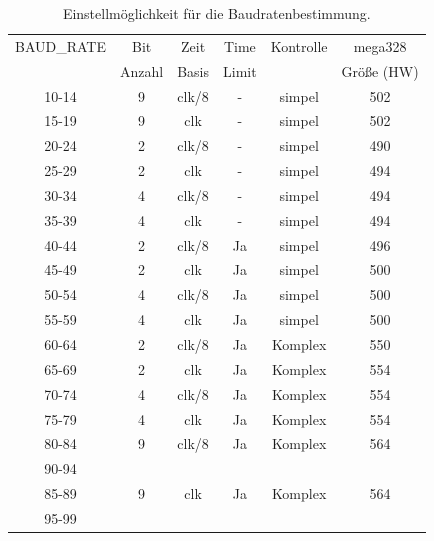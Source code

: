 \begin{table}[H]
  \begin{center}
    \begin{tabular}{| c | c | c | c | c | c |}
    \hline
	    BAUD\_RATE  & Bit    & Zeit  & Time  & Kontrolle & mega328 \\
			& Anzahl & Basis & Limit &           & Größe (HW)\\
    \hline
    \hline
	    10-14      &  9     & clk/8 &   -  & simpel   & 502  \\
    \hline
	    15-19      &  9     & clk   &   -  & simpel   & 502  \\
    \hline
	    20-24      &  2     & clk/8 &   -  & simpel   & 490  \\
    \hline
	    25-29      &  2     &  clk  &   -  & simpel   & 494  \\
    \hline
	    30-34      &  4     & clk/8 &   -  & simpel   & 494  \\
    \hline
	    35-39      &  4     &  clk  &   -  & simpel   & 494  \\
    \hline
	    40-44      &  2     & clk/8 &  Ja  & simpel   & 496  \\
    \hline
	    45-49      &  2     &  clk  &  Ja  & simpel   & 500  \\
    \hline
	    50-54      &  4     & clk/8 &  Ja  & simpel   & 500  \\
    \hline
	    55-59      &  4     &  clk  &  Ja  & simpel   & 500  \\
    \hline
    \hline
	    60-64      &  2     & clk/8 &  Ja  & Komplex  & 550  \\
    \hline
	    65-69      &  2     & clk   &  Ja  & Komplex  & 554  \\
    \hline
	    70-74      &  4     & clk/8 &  Ja  & Komplex  & 554  \\
    \hline
	    75-79      &  4     & clk   &  Ja  & Komplex  & 554  \\
    \hline
	    80-84      &  9     & clk/8 &  Ja  & Komplex  & 564  \\
	    90-94      &        &       &      &          &     \\
    \hline 
	    85-89      &  9     & clk   &  Ja  & Komplex  & 564 \\
	    95-99      &        &       &      &          &     \\
    \hline
    \end{tabular}
  \end{center}
  \caption{Einstellmöglichkeit für die Baudratenbestimmung.}
  \label{tab:AutoBaudControl}
\end{table}


